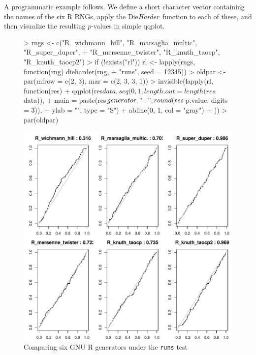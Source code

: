 \documentclass[12pt]{article}
\newcommand{\dieharder}{\textrm{Die}\textsl{Harder}}
\begin{document}
A programmatic example follows.  We define a short character vector
containing the names of the six R RNGs, apply the \dieharder\ function
to each of these, and then visualize the resulting $p$-values in simple
qqplot.

\begin{figure}[htbp]
  \begin{center}
    \begin{footnotesize}
%
\begin{Schunk}
\begin{Sinput}
> rngs <- c("R_wichmann_hill", "R_marsaglia_multic", "R_super_duper", 
+     "R_mersenne_twister", "R_knuth_taocp", "R_knuth_taocp2")
> if (!exists("rl")) rl <- lapply(rngs, function(rng) dieharder(rng, 
+     "runs", seed = 12345))
> oldpar <- par(mfrow = c(2, 3), mar = c(2, 3, 3, 1))
> invisible(lapply(rl, function(res) {
+     qqplot(res$data, seq(0, 1, length.out = length(res$data)), 
+         main = paste(res$generator, ":", round(res$p.value, digits = 3)), 
+         ylab = "", type = "S")
+     abline(0, 1, col = "gray")
+ }))
> par(oldpar)
\end{Sinput}
\end{Schunk}
\includegraphics{RDieHarder-r-rngs}
% 
\end{footnotesize}
\caption{Comparing six GNU R generators under the \texttt{runs} test}
\end{center}
\end{figure}
\end{document}
